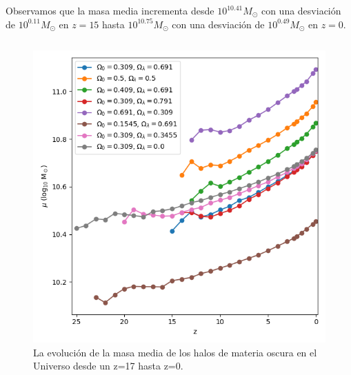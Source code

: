 \documentclass{beamer}
\begin{document}
	\begin{frame}
			\small Observamos que la masa media incrementa desde $10^{10.41}M_\odot$ con una desviación de $10^{0.11}M_\odot$ en $z=15$ hasta $10^{10.75}M_\odot$ con una desviación de $10^{0.49}M_\odot$ en $z=0$.
		\begin{columns}[t]
			\begin{column}{.5\textwidth}
				\begin{figure}
					\centering
					\includegraphics[scale=0.28]{Conc/MassMean_Conc.png}
					\caption{\footnotesize La evolución de la masa media de los halos de materia oscura en el Universo desde un z=17 hasta z=0.}
					\label{fig:Conc-MassMean}
				\end{figure}
			\end{column}
			

\end{columns}
\end{frame}
\end{document}
